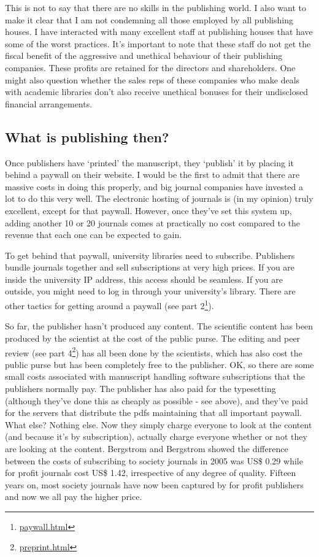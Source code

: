 \documentclass[
]{krantz}
\renewcommand{\href}[2]{#2\footnote{\url{#1}}}
\begin{document}
This is not to say that there are no skills in the publishing world. I also want to make it clear that I am not condemning all those employed by all publishing houses. I have interacted with many excellent staff at publishing houses that have some of the worst practices. It's important to note that these staff do not get the fiscal benefit of the aggressive and unethical behaviour of their publishing companies. These profits are retained for the directors and shareholders. One might also question whether the sales reps of these companies who make deals with academic libraries don't also receive unethical bonuses for their undisclosed financial arrangements.

\hypertarget{what-is-publishing-then}{%
\subsection{What is publishing then?}\label{what-is-publishing-then}}

Once publishers have `printed' the manuscript, they `publish' it by placing it behind a paywall on their website. I would be the first to admit that there are massive costs in doing this properly, and big journal companies have invested a lot to do this very well. The electronic hosting of journals is (in my opinion) truly excellent, except for that paywall. However, once they've set this system up, adding another 10 or 20 journals comes at practically no cost compared to the revenue that each one can be expected to gain.

To get behind that paywall, university libraries need to subscribe. Publishers bundle journals together and sell subscriptions at very high prices. If you are inside the university IP address, this access should be seamless. If you are outside, you might need to log in through your university's library. There are other tactics for getting around a paywall (\href{paywall.html}{see part 2}).

So far, the publisher hasn't produced any content. The scientific content has been produced by the scientist at the cost of the public purse. The editing and peer review (\href{preprint.html}{see part 4}) has all been done by the scientists, which has also cost the public purse but has been completely free to the publisher. OK, so there are some small costs associated with manuscript handling software subscriptions that the publishers normally pay. The publisher has also paid for the typesetting (although they've done this as cheaply as possible - see above), and they've paid for the servers that distribute the pdfs maintaining that all important paywall. What else? Nothing else. Now they simply charge everyone to look at the content (and because it's by subscription), actually charge everyone whether or not they are looking at the content. Bergstrom and Bergstrom \citeyearpar{bergstrom2006economics} showed the difference between the costs of subscribing to society journals in 2005 was US\$ 0.29 while for profit journals cost US\$ 1.42, irrespective of any degree of quality. Fifteen years on, most society journals have now been captured by for profit publishers and now we all pay the higher price.
\end{document}
